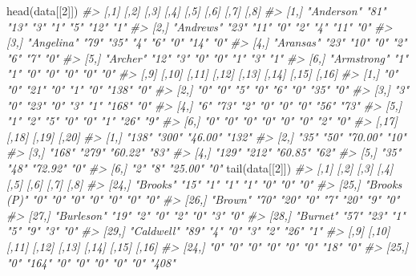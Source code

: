 \documentclass[
]{krantz}
\makeatletter
\newenvironment{Shaded}{\begin{snugshade}}{\end{snugshade}}
\newcommand{\CommentTok}[1]{\textcolor[rgb]{0.37,0.37,0.37}{\textit{#1}}}
\newcommand{\DecValTok}[1]{\textcolor[rgb]{0.06,0.06,0.06}{#1}}
\newcommand{\FunctionTok}[1]{\textcolor[rgb]{0,0,0}{#1}}
\newcommand{\NormalTok}[1]{#1}
\newenvironment{kframe}{%
\medskip{}
\setlength{\fboxsep}{.8em}
 \def\at@end@of@kframe{}%
 \ifinner\ifhmode%
  \def\at@end@of@kframe{\end{minipage}}%
  \begin{minipage}{\columnwidth}%
 \fi\fi%
 \def\FrameCommand##1{\hskip\@totalleftmargin \hskip-\fboxsep
 \colorbox{shadecolor}{##1}\hskip-\fboxsep
     \hskip-\linewidth \hskip-\@totalleftmargin \hskip\columnwidth}%
 \MakeFramed {\advance\hsize-\width
   \@totalleftmargin\z@ \linewidth\hsize
   \@setminipage}}%
 {\par\unskip\endMakeFramed%
 \at@end@of@kframe}
\renewenvironment{Shaded}{\begin{kframe}}{\end{kframe}}
\makeatother
\begin{document}
\begin{Shaded}
\begin{Highlighting}[]
\FunctionTok{head}\NormalTok{(data[[}\DecValTok{2}\NormalTok{]])}
\CommentTok{\#\textgreater{}      [,1]        [,2] [,3] [,4] [,5] [,6] [,7] [,8]}
\CommentTok{\#\textgreater{} [1,] "Anderson"  "81" "13" "3"  "1"  "5"  "12" "1" }
\CommentTok{\#\textgreater{} [2,] "Andrews"   "23" "11" "0"  "2"  "4"  "11" "0" }
\CommentTok{\#\textgreater{} [3,] "Angelina"  "79" "35" "4"  "6"  "0"  "14" "0" }
\CommentTok{\#\textgreater{} [4,] "Aransas"   "23" "10" "0"  "2"  "6"  "7"  "0" }
\CommentTok{\#\textgreater{} [5,] "Archer"    "12" "3"  "0"  "0"  "1"  "3"  "1" }
\CommentTok{\#\textgreater{} [6,] "Armstrong" "1"  "1"  "0"  "0"  "0"  "0"  "0" }
\CommentTok{\#\textgreater{}      [,9] [,10] [,11] [,12] [,13] [,14] [,15] [,16]}
\CommentTok{\#\textgreater{} [1,] "0"  "0"   "21"  "0"   "1"   "0"   "138" "0"  }
\CommentTok{\#\textgreater{} [2,] "0"  "0"   "5"   "0"   "6"   "0"   "35"  "0"  }
\CommentTok{\#\textgreater{} [3,] "3"  "0"   "23"  "0"   "3"   "1"   "168" "0"  }
\CommentTok{\#\textgreater{} [4,] "6"  "73"  "2"   "0"   "0"   "0"   "56"  "73" }
\CommentTok{\#\textgreater{} [5,] "1"  "2"   "5"   "0"   "0"   "1"   "26"  "9"  }
\CommentTok{\#\textgreater{} [6,] "0"  "0"   "0"   "0"   "0"   "0"   "2"   "0"  }
\CommentTok{\#\textgreater{}      [,17] [,18] [,19]   [,20]}
\CommentTok{\#\textgreater{} [1,] "138" "300" "46.00" "132"}
\CommentTok{\#\textgreater{} [2,] "35"  "50"  "70.00" "10" }
\CommentTok{\#\textgreater{} [3,] "168" "279" "60.22" "83" }
\CommentTok{\#\textgreater{} [4,] "129" "212" "60.85" "62" }
\CommentTok{\#\textgreater{} [5,] "35"  "48"  "72.92" "0"  }
\CommentTok{\#\textgreater{} [6,] "2"   "8"   "25.00" "0"}
\FunctionTok{tail}\NormalTok{(data[[}\DecValTok{2}\NormalTok{]])}
\CommentTok{\#\textgreater{}       [,1]         [,2] [,3] [,4] [,5] [,6] [,7] [,8]}
\CommentTok{\#\textgreater{} [24,] "Brooks"     "15" "1"  "1"  "1"  "0"  "0"  "0" }
\CommentTok{\#\textgreater{} [25,] "Brooks (P)" "0"  "0"  "0"  "0"  "0"  "0"  "0" }
\CommentTok{\#\textgreater{} [26,] "Brown"      "70" "20" "0"  "7"  "20" "9"  "0" }
\CommentTok{\#\textgreater{} [27,] "Burleson"   "19" "2"  "0"  "2"  "0"  "3"  "0" }
\CommentTok{\#\textgreater{} [28,] "Burnet"     "57" "23" "1"  "5"  "9"  "3"  "0" }
\CommentTok{\#\textgreater{} [29,] "Caldwell"   "89" "4"  "0"  "3"  "2"  "26" "1" }
\CommentTok{\#\textgreater{}       [,9] [,10] [,11] [,12] [,13] [,14] [,15] [,16]}
\CommentTok{\#\textgreater{} [24,] "0"  "0"   "0"   "0"   "0"   "0"   "18"  "0"  }
\CommentTok{\#\textgreater{} [25,] "0"  "164" "0"   "0"   "0"   "0"   "0"   "408"}

\end{Highlighting}
\end{Shaded}
\end{document}
